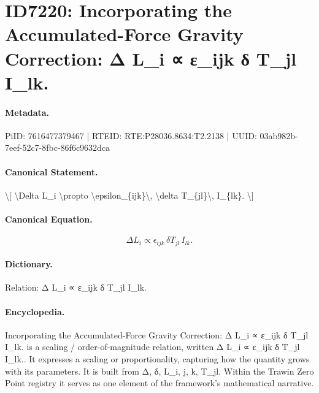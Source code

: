 \section*{ID7220: Incorporating the Accumulated-Force Gravity Correction: Δ L\_i ∝ ε\_ijk δ T\_jl I\_lk.}
\paragraph{Metadata.}
PiID: 7616477379467 | RTEID: RTE:P28036.8634:T2.2138 | UUID: 03ab982b-7eef-52c7-8fbc-86f6c9632dca

\paragraph{Canonical Statement.}
\textbackslash{}[ \textbackslash{}Delta L\_i \textbackslash{}propto \textbackslash{}epsilon\_\{ijk\}\textbackslash{}, \textbackslash{}delta T\_\{jl\}\textbackslash{}, I\_\{lk\}. \textbackslash{}]

\paragraph{Canonical Equation.}
\[
\Delta L_i \propto \epsilon_{ijk}\, \delta T_{jl}\, I_{lk}.
\]

\paragraph{Dictionary.}
Relation: Δ L\_i ∝ ε\_ijk δ T\_jl I\_lk.

\paragraph{Encyclopedia.}
Incorporating the Accumulated-Force Gravity Correction: Δ L\_i ∝ ε\_ijk δ T\_jl I\_lk. is a scaling / order-of-magnitude relation, written Δ L\_i ∝ ε\_ijk δ T\_jl I\_lk.. It expresses a scaling or proportionality, capturing how the quantity grows with its parameters. It is built from Δ, δ, L\_i, j, k, T\_jl. Within the Trawin Zero Point registry it serves as one element of the framework's mathematical narrative.
